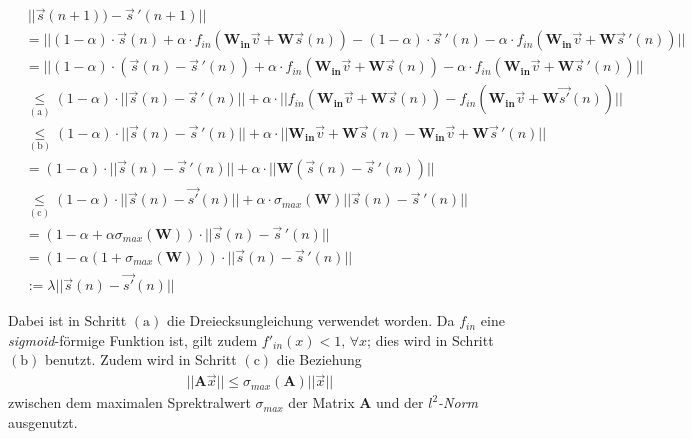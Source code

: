 \begin{appendices}
\begin{align*}
&~||\vec{s}(n+1))- \vec{s}\,'(n+1)|| \\
&= ||(1 - \alpha) \cdot \vec{s}(n)  + \alpha \cdot f_{in}\left( \mathbf{W_{in}} \vec{v} + \mathbf{W} \vec{s}(n) \right) - (1 - \alpha) \cdot \vec{s}\,'(n)  - \alpha \cdot f_{in}\left( \mathbf{W_{in}} \vec{v} + \mathbf{W} \vec{s}\,'(n) \right)|| \\
&= || (1-\alpha)\cdot(\vec{s}(n)-\vec{s}\,'(n)) + \alpha \cdot f_{in}\left( \mathbf{W_{in}} \vec{v} + \mathbf{W} \vec{s}(n) \right) - \alpha \cdot f_{in}\left( \mathbf{W_{in}} \vec{v} + \mathbf{W} \vec{s}\,'(n) \right) ||\\
&\underset{\mathrm{(a)}}{\leq} (1-\alpha)\cdot|| \vec{s}(n)-\vec{s}\,'(n)|| + \alpha \cdot ||f_{in}\left( \mathbf{W_{in}} \vec{v} + \mathbf{W} \vec{s}(n) \right) - f_{in}\left( \mathbf{W_{in}} \vec{v} + \mathbf{W} \vec{s'}(n) \right) ||\\
&\underset{\mathrm{(b)}}{\leq} (1-\alpha)\cdot|| \vec{s}(n)-\vec{s}\,'(n)|| + \alpha \cdot ||\mathbf{W_{in}} \vec{v} + \mathbf{W} \vec{s}(n)- \mathbf{W_{in}} \vec{v} + \mathbf{W} \vec{s}\,'(n) ||\\
&= (1-\alpha)\cdot|| \vec{s}(n)-\vec{s}\,'(n)|| + \alpha \cdot ||\mathbf{W} \left(\vec{s}(n)- \vec{s}\,'(n) \right)||\\
&\underset{\mathrm{(c)}}{\leq} (1-\alpha)\cdot ||\vec{s}(n)-\vec{s'}(n)|| + \alpha \cdot \sigma_{max}\left(\mathbf{W}\right)||\vec{s}(n)- \vec{s}\,'(n) ||\\
&= \left(1-\alpha+\alpha\sigma_{max} \left(\mathbf{W} \right) \right) \cdot ||\vec{s}(n)-\vec{s}\,'(n)|| \\
&= \left(1-\alpha(1+\sigma_{max} \left(\mathbf{W} \right)) \right) \cdot ||\vec{s}(n)-\vec{s}\,'(n)|| \\
&:= \lambda ||\vec{s}(n)-\vec{s'}(n)||
\end{align*}

Dabei ist in Schritt $\mathrm{(a)}$ die Dreiecksungleichung verwendet worden. Da $f_{in}$ eine \textit{sigmoid}-förmige Funktion ist, gilt zudem $f'_{in}(x) < 1,\, \forall x$; dies wird in Schritt $\mathrm{(b)}$ benutzt. Zudem wird in Schritt $\mathrm{(c)}$ die Beziehung
\begin{align*}
||\mathbf{A} \vec{x}|| \leq \sigma_{max}\left(\mathbf{A} \right) ||\vec{x}||
\end{align*}
zwischen dem maximalen Sprektralwert $\sigma_{max}$ der Matrix $\mathbf{A}$ und der \textit{$l^2$-Norm} ausgenutzt.\\


\end{appendices}
